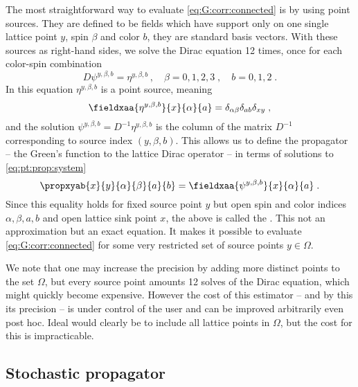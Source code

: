 The most straightforward way to evaluate \cref{eq:G:corr:connected} is by using point sources. They are defined to be fields which have support only on one single lattice point $y$, spin $\beta$ and color $b$, \ie they are standard basis vectors. With these sources as right-hand sides, we solve the Dirac equation \num{12} times, once for each color-spin combination
\begin{equation} \label{eq:pt:prop:system}
D \psi^{y, \beta, b} = \eta^{y, \beta, b} \,,
\quad
\beta = 0,1,2,3 \;,
\quad
b = 0,1,2 \;.
\end{equation}
In this equation $\eta^{y, \beta, b}$ is a point source, meaning
\begin{equation}
\fieldxaa{\eta^{y, \beta, b}}{x}{\alpha}{a} = \delta_{\alpha \beta} \delta_{ab} \delta_{xy} \;,
\end{equation}
and the solution $\psi^{y, \beta, b} = D^{-1} \eta^{y, \beta, b}$ is the column of the matrix $D^{-1}$ corresponding to source index $(y, \beta, b)$.
This allows us to define the propagator -- the Green's function to the lattice Dirac operator -- in terms of solutions to \cref{eq:pt:prop:system}
\begin{equation} \label{eq:prop:pt-to-all}
\propxyab{x}{y}{\alpha}{\beta}{a}{b} = \fieldxaa{\psi^{y, \beta, b}}{x}{\alpha}{a} \;.
\end{equation}
Since this equality holds for fixed source point $y$ but open spin and color indices $\alpha, \beta, a, b$ and open lattice sink point $x$, the above is called the .
This not an approximation but an exact equation.
It makes it possible to evaluate \cref{eq:G:corr:connected} for some very restricted set of source points $y \in \Omega$.

We note that one may increase the precision by adding more distinct points to the set $\Omega$, but every source point amounts \num{12} solves of the Dirac equation, which might quickly become expensive.
However the cost of this estimator -- and by this its precision -- is under control of the user and can be improved arbitrarily even post hoc.
Ideal would clearly be to include all lattice points in $\Omega$, but the cost for this is impracticable.

\subsection{Stochastic propagator}
\label{sec:stochastic:prop}

